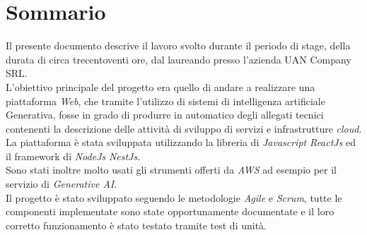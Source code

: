 \cleardoublepage
{}
{}
\begingroup
\let\clearpage\relax
\let\cleardoublepage\relax
\let\cleardoublepage\relax

\chapter*{Sommario}

Il presente documento descrive il lavoro svolto durante il periodo di stage, della durata di circa trecentoventi ore, dal laureando \myName presso l'azienda UAN Company SRL. \\
L'obiettivo principale del progetto era quello di andare a realizzare una piattaforma \textit{Web}, che tramite l'utilizzo di sistemi di intelligenza artificiale Generativa, 
fosse in grado di produrre in automatico degli allegati tecnici contenenti la descrizione delle attività di sviluppo di servizi e infrastrutture \textit{cloud}. \\
La piattaforma è stata sviluppata utilizzando la libreria di \textit{Javascript} \textit{ReactJs} ed il framework di \textit{NodeJs} \textit{NestJs}.\\
Sono stati inoltre molto usati gli strumenti offerti da \textit{AWS} ad esempio per il servizio di \textit{Generative AI}. \\
Il progetto è stato sviluppato seguendo le metodologie \textit{Agile} e \textit{Scrum}, tutte le componenti implementate sono state opportunamente documentate e il loro corretto funzionamento è stato testato tramite test di unità.\\ 





\endgroup

\vfill
